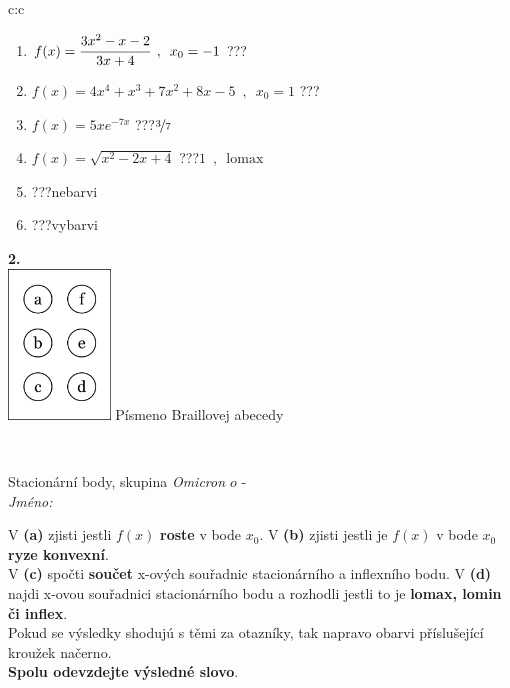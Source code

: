 \documentclass[10pt]{report}
\newcommand\omicron{o}
\begin{document}
\begin{tabular}{c:c}
\begin{minipage}[c][104.5mm][t]{0.5\linewidth}
\begin{center}
\begin{minipage}{0.79\linewidth}
\begin{center}
\begin{varwidth}{\linewidth}
\begin{enumerate}
\item $f(x)=\cfrac{3x^2-x-2}{3x+4}\enspace , \enspace x_0=-1$\quad \dotfill\; ???\;\dotfill \quad {}
\item $f(x)=4x^4+x^3+7x^2+8x-5\enspace , \enspace x_0=1$\quad \dotfill\; ???\;\dotfill \quad {}
\item $f(x)=5xe^{-7x}$\quad \dotfill\; ???\;\dotfill \quad $\nicefrac{3}{7}$
\item $f(x)=\sqrt{x^2-2x+4}$\quad \dotfill\; ???\;\dotfill \quad $1\enspace , \enspace\mathrm{lomax}$
\item \quad \dotfill\; ???\;\dotfill \quad nebarvi
\item \quad \dotfill\; ???\;\dotfill \quad vybarvi
\end{enumerate}
\end{varwidth}
\end{center}
\end{minipage}
\begin{minipage}{0.20\linewidth}
\begin{center}
{\Huge\bfseries 2.} \\[2mm]
\includegraphics[height=40mm]{../images/braille.png}
{\small Písmeno Braillovej abecedy}
\end{center}
\end{minipage}
\end{center}
\end{minipage}
\\ \hdashline
\begin{minipage}[c][104.5mm][t]{0.5\linewidth}
\begin{center}
\vspace{7mm}
{\huge Stacionární body, skupina \textit{Omicron $\omicron$} -}\\[5mm]
\textit{Jméno:}\phantom{xxxxxxxxxxxxxxxxxxxxxxxxxxxxxxxxxxxxxxxxxxxxxxxxxxxxxxxxxxxxxxxxx}\\[5mm]
\begin{minipage}{0.95\linewidth}
\begin{center}
{\small V \textbf{(a)} zjisti jestli $f(x)$ \textbf{roste} v bode $x_0$. V \textbf{(b)} zjisti jestli je $f(x)$ v bode $x_0$ \textbf{ryze konvexní}.\\V \textbf{(c)} spočti \textbf{součet} x-ových souřadnic stacionárního a inflexního bodu. V \textbf{(d)} najdi x-ovou souřadnici stacionárního bodu a rozhodli jestli to je \textbf{lomax, lomin či inflex}.\\Pokud se výsledky shodujú s těmi za otazníky, tak napravo obarvi příslušející kroužek načerno.\\\textbf{Spolu odevzdejte výsledné slovo}}.

\end{center}
\end{minipage}
\end{center}
\end{minipage}
\end{tabular}
\end{document}
